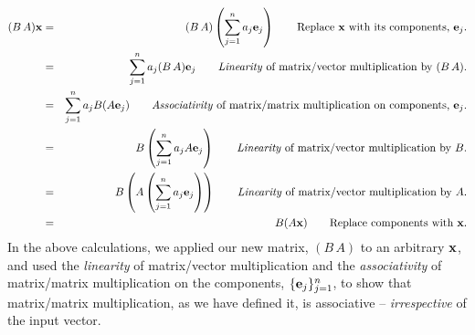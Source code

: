 \documentclass{article}
\begin{document}
\begin{eqnarray}
	(B\, A){\bf x} & = & (B \, A)\left(\sum_{j=1}^n a_j {\bf e}_j\right) \quad\quad \text{Replace ${\bf x}$ with its components, ${\bf e}_j$.}\nonumber \\
				   & = &\sum_{j=1}^n a_j (B \, A){\bf e}_j \quad\quad \text{{\em Linearity\/} of matrix/vector multiplication by $(B \, A)$.}\nonumber \\
				   & = &\sum_{j=1}^n a_j B (A{\bf e}_j) \quad\quad \text{{\em Associativity\/} of matrix/matrix multiplication on components, ${\bf e}_j$.}\nonumber \\
				   & = &B\left(\sum_{j=1}^n a_j A{\bf e}_j\right) \quad\quad \text{{\em Linearity\/} of matrix/vector multiplication by $B$.}\nonumber \\
				   & = &B\left( A\left(\sum_{j=1}^n a_j {\bf e}_j\right)\right) \quad\quad \text{{\em Linearity\/} of matrix/vector multiplication by  $A$.}\nonumber \\
				   & = &B( A {\bf x}) \quad\quad \text{Replace components with ${\bf x}$.}
\end{eqnarray}
In the above calculations, we applied our new matrix, $(B \, A)$ to an arbitrary ${\bf x}$, and 
used the {\em linearity\/} of matrix/vector multiplication and the {\em associativity\/}
of matrix/matrix multiplication on the components, $\{{\bf e}_j\}_{j=1}^n$, to show that matrix/matrix
multiplication, as we have defined it, is associative -- {\em irrespective\/} of the input vector.
\end{document}
